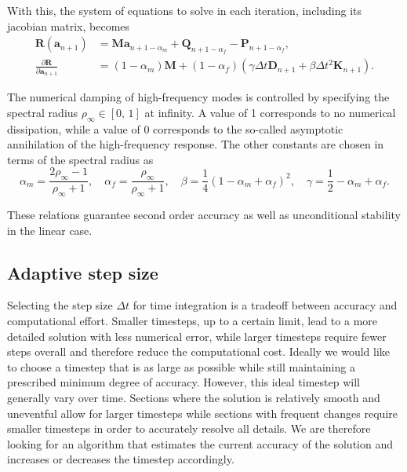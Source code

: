 With this, the system of equations to solve in each iteration, including its jacobian matrix, becomes
%
\begin{align}
\boldsymbol{R}(\boldsymbol{a}_{n+1}) &= \boldsymbol{M}\boldsymbol{a}_{n+1-\alpha_m} + \boldsymbol{Q}_{n+1-\alpha_f} - \boldsymbol{P}_{n+1-\alpha_f}, \\
\frac{\partial \boldsymbol{R}}{\partial \boldsymbol{a}_{n+1}} &= (1 - \alpha_m)\boldsymbol{M} + (1 - \alpha_f)\left( \gamma \Delta t \boldsymbol{D}_{n+1} + \beta \Delta t^2 \boldsymbol{K}_{n+1} \right).
\end{align}

The numerical damping of high-frequency modes is controlled by specifying the spectral radius $\rho_{\infty} \in [0,\,1]$ at infinity.
A value of 1 corresponds to no numerical dissipation, while a value of 0 corresponds to the so-called asymptotic annihilation of the high-frequency response.
The other constants are chosen in terms of the spectral radius as
%
\begin{equation}
\alpha_m = \frac{2\rho_{\infty} - 1}{\rho_{\infty} + 1},\quad \alpha_f = \frac{\rho_{\infty}}{\rho_{\infty} + 1},\quad \beta = \frac{1}{4}\left(1 - \alpha_m + \alpha_f\right)^2,\quad \gamma = \frac{1}{2} - \alpha_m + \alpha_f.
\end{equation}

These relations guarantee second order accuracy as well as unconditional stability in the linear case.

\subsection{Adaptive step size}

Selecting the step size $\Delta t$ for time integration is a tradeoff between accuracy and computational effort.
Smaller timesteps, up to a certain limit, lead to a more detailed solution with less numerical error, while larger timesteps require fewer steps overall and therefore reduce the computational cost.
Ideally we would like to choose a timestep that is as large as possible while still maintaining a prescribed minimum degree of accuracy.
However, this ideal timestep will generally vary over time.
Sections where the solution is relatively smooth and uneventful allow for larger timesteps while sections with frequent changes require smaller timesteps in order to accurately resolve all details.
We are therefore looking for an algorithm that estimates the current accuracy of the solution and increases or decreases the timestep accordingly.

